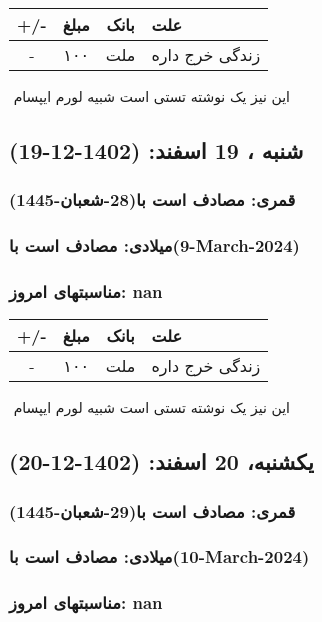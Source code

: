 \documentclass{article}
\newcommand{\rnote}[1]{\marginpar{\textcolor{color}{\StrSubstitute{\##1}{ }{\_}}}}
\newcommand{\myRow}[4]{
    #1 & #2 & #3 & #4 \\ \hline
}
\begin{document}
\begin{tabular}{ | c | c | c | p{5cm} |}
    \hline
    \myRow{ +/- }{مبلغ}{بانک}{علت}
    \myRow{-}{۱۰۰}{ملت}{زندگی خرج داره}
\end{tabular}
\newline
\newline

‌
\rnote{تست}
این نیز یک نوشته تستی است شبیه لورم ایپسام




\newpage
{}
\textcolor{color}{
\section{ شنبه ، 19 اسفند: (1402-12-19) }
\subsubsection*{قمری: مصادف است با(28-شعبان-1445)} 
\subsubsection*{میلادی: مصادف است با(9-March-2024)}
\subsubsection*{مناسبتهای امروز: nan}
}


\begin{tabular}{ | c | c | c | p{5cm} |}
    \hline
    \myRow{ +/- }{مبلغ}{بانک}{علت}
    \myRow{-}{۱۰۰}{ملت}{زندگی خرج داره}
\end{tabular}
\newline
\newline

‌
\rnote{تست}
این نیز یک نوشته تستی است شبیه لورم ایپسام




\newpage
{}
\textcolor{color}{
\section{ یکشنبه، 20 اسفند: (1402-12-20) }
\subsubsection*{قمری: مصادف است با(29-شعبان-1445)} 
\subsubsection*{میلادی: مصادف است با(10-March-2024)}
\subsubsection*{مناسبتهای امروز: nan}
}
\end{document}

